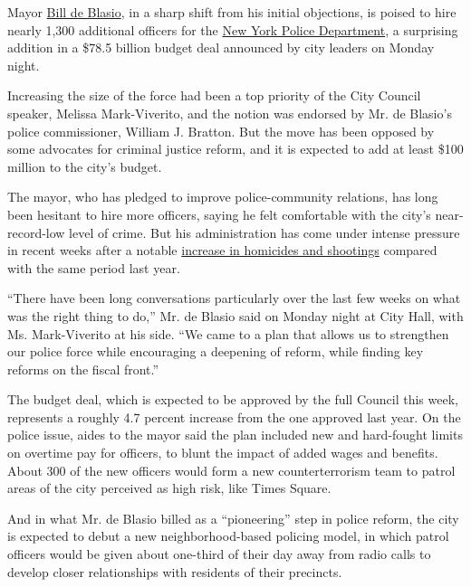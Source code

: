 Mayor
\href{http://topics.nytimes3xbfgragh.onion/top/reference/timestopics/people/d/bill_de_blasio/index.html?inline=nyt-per}{Bill
de Blasio}, in a sharp shift from his initial objections, is poised to
hire nearly 1,300 additional officers for the
\href{http://topics.nytimes3xbfgragh.onion/top/reference/timestopics/organizations/n/new_york_city_police_department/index.html?inline=nyt-org}{New
York Police Department}, a surprising addition in a \$78.5 billion
budget deal announced by city leaders on Monday night.

Increasing the size of the force had been a top priority of the City
Council speaker, Melissa Mark-Viverito, and the notion was endorsed by
Mr. de Blasio's police commissioner, William J. Bratton. But the move
has been opposed by some advocates for criminal justice reform, and it
is expected to add at least \$100 million to the city's budget.

The mayor, who has pledged to improve police-community relations, has
long been hesitant to hire more officers, saying he felt comfortable
with the city's near-record-low level of crime. But his administration
has come under intense pressure in recent weeks after a notable
\href{http://www.nytimes3xbfgragh.onion/2015/06/02/nyregion/gunplay-rises-in-new-york-reviving-issue-for-de-blasio.html}{increase
in homicides and shootings} compared with the same period last year.

``There have been long conversations particularly over the last few
weeks on what was the right thing to do,'' Mr. de Blasio said on Monday
night at City Hall, with Ms. Mark-Viverito at his side. ``We came to a
plan that allows us to strengthen our police force while encouraging a
deepening of reform, while finding key reforms on the fiscal front.''

The budget deal, which is expected to be approved by the full Council
this week, represents a roughly 4.7 percent increase from the one
approved last year. On the police issue, aides to the mayor said the
plan included new and hard-fought limits on overtime pay for officers,
to blunt the impact of added wages and benefits. About 300 of the new
officers would form a new counterterrorism team to patrol areas of the
city perceived as high risk, like Times Square.

And in what Mr. de Blasio billed as a ``pioneering'' step in police
reform, the city is expected to debut a new neighborhood-based policing
model, in which patrol officers would be given about one-third of their
day away from radio calls to develop closer relationships with residents
of their precincts.

